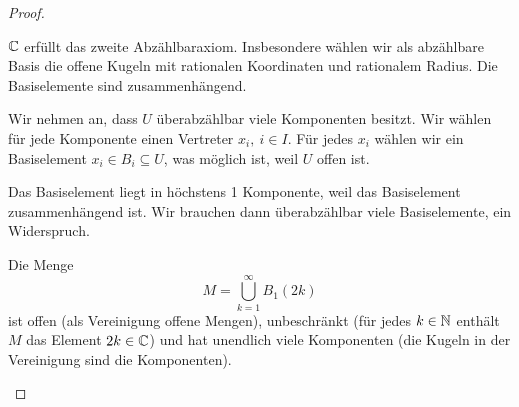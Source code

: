 \begin{proof}
	\begin{parts}
	\item $\mathbb{C}$ erfüllt das zweite Abzählbaraxiom. Insbesondere wählen wir als abzählbare Basis die offene Kugeln mit rationalen Koordinaten und rationalem Radius. Die Basiselemente sind zusammenhängend. 

	Wir nehmen an, dass $U$ überabzählbar viele Komponenten besitzt. Wir wählen für jede Komponente einen Vertreter $x_i,~i\in I$. Für jedes $x_i$ wählen wir ein Basiselement $x_i\in B_i\subseteq U$, was möglich ist, weil $U$ offen ist.
	
	Das Basiselement liegt in höchstens 1 Komponente, weil das Basiselement zusammenhängend ist. Wir brauchen dann überabzählbar viele Basiselemente, ein Widerspruch.
\item Die Menge
	\[
	M=\bigcup_{k=1}^\infty B_1(2k)
	\]
	ist offen (als Vereinigung offene Mengen), unbeschränkt (für jedes $k\in \mathbb{N}$ enthält $M$ das Element $2k\in \mathbb{C}$) und hat unendlich viele Komponenten (die Kugeln in der Vereinigung sind die Komponenten).\qedhere
\end{parts}
\end{proof}
